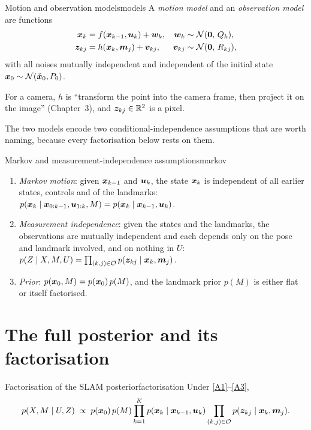 \begin{definition}{Motion and observation models}{models}
A \emph{motion model} and an \emph{observation model} are functions
\begin{align}
  \bm{x}_k &= f(\bm{x}_{k-1},\bm{u}_k) + \bm{w}_k,
  & \bm{w}_k &\sim \mathcal{N}(\bm{0},\,Q_k),\label{eq:motion}\\
  \bm{z}_{kj} &= h(\bm{x}_k,\bm{m}_j) + \bm{v}_{kj},
  & \bm{v}_{kj} &\sim \mathcal{N}(\bm{0},\,R_{kj}),\label{eq:obs}
\end{align}
with all noises mutually independent and independent of the initial state
$\bm{x}_0\sim\mathcal{N}(\check{\bm{x}}_0,P_0)$.
\end{definition}

For a camera, $h$ is ``transform the point into the camera frame, then
project it on the image'' (Chapter~3), and $\bm{z}_{kj}\in\mathbb{R}^2$ is a pixel.

The two models encode two conditional-independence assumptions that are
worth naming, because every factorisation below rests on them.

\begin{definition}{Markov and measurement-independence assumptions}{markov}
\begin{enumerate}[label=(A\arabic*),nosep]
\item\label{A1} \emph{Markov motion}: given $\bm{x}_{k-1}$ and $\bm{u}_k$, the
  state $\bm{x}_k$ is independent of all earlier states, controls and of the
  landmarks:
  $p(\bm{x}_k\mid \bm{x}_{0:k-1},\bm{u}_{1:k},M)=p(\bm{x}_k\mid\bm{x}_{k-1},\bm{u}_k)$.
\item\label{A2} \emph{Measurement independence}: given the states and the
  landmarks, the observations are mutually independent and each depends
  only on the pose and landmark involved, and on nothing in $U$:
  $p(Z\mid X,M,U)=\prod_{(k,j)\in\mathcal{O}}p(\bm{z}_{kj}\mid\bm{x}_k,\bm{m}_j)$.
\item\label{A3} \emph{Prior}: $p(\bm{x}_0,M)=p(\bm{x}_0)\,p(M)$, and the landmark
  prior $p(M)$ is either flat or itself factorised.
\end{enumerate}
\end{definition}

\section{The full posterior and its factorisation}

\begin{proposition}{Factorisation of the SLAM posterior}{factorisation}
Under \ref{A1}--\ref{A3},
\begin{equation}\label{eq:posterior}
  p(X,M\mid U,Z)\;\propto\;
  p(\bm{x}_0)\,p(M)
  \prod_{k=1}^{K}p(\bm{x}_k\mid\bm{x}_{k-1},\bm{u}_k)
  \prod_{(k,j)\in\mathcal{O}}p(\bm{z}_{kj}\mid\bm{x}_k,\bm{m}_j).
\end{equation}
\end{proposition}

